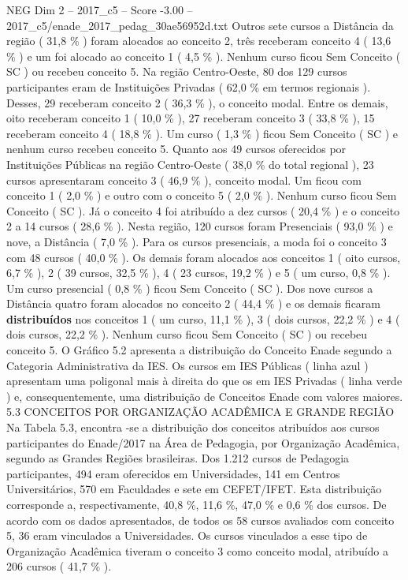 \begin{textsample}{NEG Dim 2 – 2017\_c5 – Score -3.00 – 2017\_c5/enade\_2017\_pedag\_30ae56952d.txt}
Outros sete cursos a Distância da região ( 31,8 \% ) foram alocados ao conceito 2, três receberam conceito 4 ( 13,6 \% ) e um foi alocado ao conceito 1 ( 4,5 \% ).
Nenhum curso ficou Sem Conceito ( SC ) ou recebeu conceito 5.
Na região Centro-Oeste, 80 dos 129 cursos participantes eram de Instituições Privadas ( 62,0 \% em termos regionais ).
Desses, 29 receberam conceito 2 ( 36,3 \% ), o conceito modal.
Entre os demais, oito receberam conceito 1 ( 10,0 \% ), 27 receberam conceito 3 ( 33,8 \% ), 15 receberam conceito 4 ( 18,8 \% ).
Um curso ( 1,3 \% ) ficou Sem Conceito ( SC ) e nenhum curso recebeu conceito 5.
Quanto aos 49 cursos oferecidos por Instituições Públicas na região Centro-Oeste ( 38,0 \% do total regional ), 23 cursos apresentaram conceito 3 ( 46,9 \% ), conceito modal.
Um ficou com conceito 1 ( 2,0 \% ) e outro com o conceito 5 ( 2,0 \% ).
Nenhum curso ficou Sem Conceito ( SC ).
Já o conceito 4 foi atribuído a dez cursos ( 20,4 \% ) e o conceito 2 a 14 cursos ( 28,6 \% ).
Nesta região, 120 cursos foram Presenciais ( 93,0 \% ) e nove, a Distância ( 7,0 \% ).
Para os cursos presenciais, a moda foi o conceito 3 com 48 cursos ( 40,0 \% ).
Os demais foram alocados aos conceitos 1 ( oito cursos, 6,7 \% ), 2 ( 39 cursos, 32,5 \% ), 4 ( 23 cursos, 19,2 \% ) e 5 ( um curso, 0,8 \% ).
Um curso presencial ( 0,8 \% ) ficou Sem Conceito ( SC ).
Dos nove cursos a Distância quatro foram alocados no conceito 2 ( 44,4 \% ) e os demais ficaram \textbf{distribuídos} nos conceitos 1 ( um curso, 11,1 \% ), 3 ( dois cursos, 22,2 \% ) e 4 ( dois cursos, 22,2 \% ).
Nenhum curso ficou Sem Conceito ( SC ) ou recebeu conceito 5.
O Gráfico 5.2 apresenta a distribuição do Conceito Enade segundo a Categoria Administrativa da IES.
Os cursos em IES Públicas ( linha azul ) apresentam uma poligonal mais à direita do que os em IES Privadas ( linha verde ) e, consequentemente, uma distribuição de Conceitos Enade com valores maiores. 5.3 CONCEITOS POR ORGANIZAÇÃO ACADÊMICA E GRANDE REGIÃO Na Tabela 5.3, encontra -se a distribuição dos conceitos atribuídos aos cursos participantes do Enade/2017 na Área de Pedagogia, por Organização Acadêmica, segundo as Grandes Regiões brasileiras.
Dos 1.212 cursos de Pedagogia participantes, 494 eram oferecidos em Universidades, 141 em Centros Universitários, 570 em Faculdades e sete em CEFET/IFET.
Esta distribuição corresponde a, respectivamente, 40,8 \%, 11,6 \%, 47,0 \% e 0,6 \% dos cursos.
De acordo com os dados apresentados, de todos os 58 cursos avaliados com conceito 5, 36 eram vinculados a Universidades.
Os cursos vinculados a esse tipo de Organização Acadêmica tiveram o conceito 3 como conceito modal, atribuído a 206 cursos ( 41,7 \% ).

\end{textsample}
